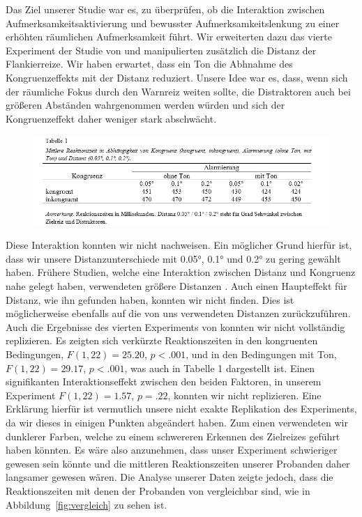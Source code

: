 Das Ziel unserer Studie war es, zu überprüfen, ob die Interaktion zwischen Aufmerksamkeitsaktivierung und bewusster Aufmerksamkeitslenkung zu einer erhöhten räumlichen Aufmerksamkeit führt. Wir erweiterten dazu das vierte Experiment der Studie von \textcite{weinbach2012relationship} und manipulierten zusätzlich die Distanz der Flankierreize.
Wir haben erwartet, dass ein Ton die Abhnahme des Kongruenzeffekts mit der Distanz reduziert. Unsere Idee war es, dass, wenn sich der räumliche Fokus durch den Warnreiz weiten sollte, die Distraktoren auch bei größeren Abständen wahrgenommen werden würden und sich der Kongruenzeffekt daher weniger stark abschwächt.\\
\begin{figure}[t]
	\centering
  \includegraphics[width=\textwidth]{grafiken/Table-Kong_RT.png}
\end{figure}
Diese Interaktion konnten wir nicht nachweisen. Ein möglicher Grund hierfür ist, dass wir unsere Distanzunterschiede mit 0.05°, 0.1° und 0.2° zu gering gewählt haben. Frühere Studien, welche eine Interaktion zwischen Distanz und Kongruenz nahe gelegt haben, verwendeten größere Distanzen \cite{eriksen1974effects}. Auch einen Haupteffekt für Distanz, wie ihn \textcite{eriksen1974effects} gefunden haben, konnten wir nicht finden. Dies ist möglicherweise ebenfalls auf die von uns verwendeten Distanzen zurückzuführen.\\
Auch die Ergebnisse des vierten Experiments von \textcite{weinbach2012relationship} konnten wir nicht vollständig replizieren. Es zeigten sich verkürzte Reaktionszeiten in den kongruenten Bedingungen, $F(1,22)=25.20$, $p<.001$, und in den Bedingungen mit Ton, $F(1,22)=29.17$, $p<.001$, was auch in Tabelle 1 dargestellt ist. Einen signifikanten Interaktionseffekt zwischen den beiden Faktoren, in unserem Experiment $F(1,22)=1.57$, $p=.22$, konnten wir nicht replizieren.
Eine Erklärung hierfür ist vermutlich unsere nicht exakte Replikation des Experiments, da wir dieses in einigen Punkten abgeändert haben. Zum einen verwendeten wir dunklerer Farben, welche zu einem schwereren Erkennen des Zielreizes geführt haben könnten. Es wäre also anzunehmen, dass unser Experiment schwieriger gewesen sein könnte und die mittleren Reaktionszeiten unserer Probanden daher langsamer gewesen wären. Die Analyse unserer Daten zeigte jedoch, dass die Reaktionszeiten mit denen der Probanden von \textcite{weinbach2012relationship} vergleichbar sind, wie in Abbildung~\ref{fig:vergleich} zu sehen ist.\\
